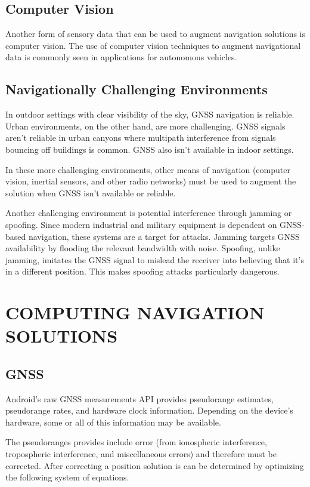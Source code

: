 \documentclass[twoside]{article}
\begin{document}
\subsection{Computer Vision}
Another form of sensory data that can be used to augment navigation solutions is computer vision.
The use of computer vision techniques to augment navigational data is commonly seen in applications
for autonomous vehicles.
\subsection{Navigationally Challenging Environments}
In outdoor settings with clear visibility of the sky, GNSS navigation is reliable. Urban environments,
on the other hand, are more challenging. GNSS signals aren't reliable in urban canyons where multipath
interference from signals bouncing off buildings is common. GNSS also isn't available in indoor settings.

In these more challenging environments, other means of navigation (computer vision, inertial sensors, and
other radio networks) must be used to augment the solution when GNSS isn't available or reliable.

Another challenging environment is potential interference through jamming or spoofing. Since modern
industrial and military equipment is dependent on GNSS-based navigation, these systems are a target
for attacks. Jamming targets GNSS availability by flooding the relevant bandwidth with noise. Spoofing,
unlike jamming, imitates the GNSS signal to mislead the receiver into believing that it's in a different
position. This makes spoofing attacks particularly dangerous.
\section{COMPUTING NAVIGATION SOLUTIONS}
\subsection{GNSS}
Android's raw GNSS measurements API provides pseudorange estimates, pseudorange rates, and hardware clock
information. Depending on the device's hardware, some or all of this information may be available.

The pseudoranges provides include error (from ionospheric interference, tropospheric interference, and
miscellaneous errors) and therefore must be corrected. After correcting a position solution is can be
determined by optimizing the following system of equations.
\end{document}
